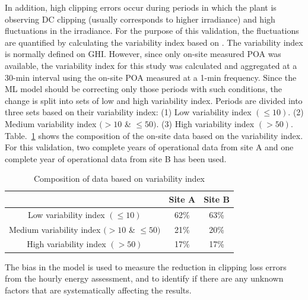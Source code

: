 \documentclass[conference]{IEEEtran}
\begin{document}
In addition, high clipping errors occur during periods in which the plant is observing DC clipping (usually corresponds to higher irradiance) and high fluctuations in the irradiance. For the purpose of this validation, the fluctuations are quantified by calculating the variability index based on \cite{Stein}. The variability index is normally defined on GHI. However, since only on-site measured POA was available, the variability index for this study was calculated and aggregated at a 30-min interval using the on-site POA measured at a 1-min frequency. Since the ML model should be correcting only those periods with such conditions, the change is split into sets of low and high variability index. Periods are divided into three sets based on their variability index: (1) Low variability index  $(\leq10)$. (2) Medium variability index  $(>10$ \& $\leq50)$. (3) High variability index $(>50)$. Table.~\ref{var_index_breakdown} shows the composition of the on-site data based on the variability index. For this validation, two complete years of operational data from site A and one complete year of operational data from site B has been used.


\begin{table}[htbp]
\caption{Composition of data based on variability index}
\begin{center}
\begin{tabular}{ |c|c|c| } 
\hline
& Site A & Site B \\
\hline
\cellcolor{gray}Low variability index $(\leq10)$ & 62\% & 63\% \\
\hline
\cellcolor{gray}Medium variability index $(>10$ \& $\leq50)$ & 21\% & 20\% \\
\hline
\cellcolor{gray}High variability index $(>50)$ & 17\% & 17\% \\
\hline
\end{tabular}
\end{center}
\label{var_index_breakdown}
\end{table}


The bias in the model is used to measure the reduction in clipping loss errors from the hourly energy assessment, and to identify if there are any unknown factors that are systematically affecting the results.
\end{document}
